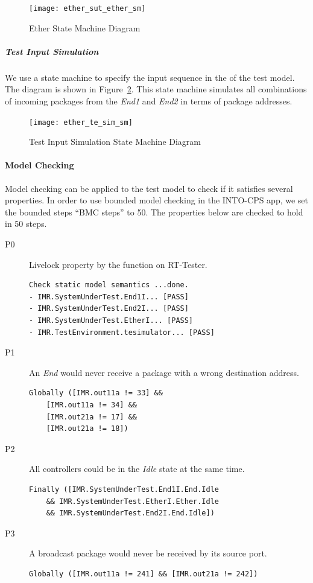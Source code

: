 \begin{figure}[htb!]
    \centering
	\texttt{[image: ether\_sut\_ether\_sm]}
    \caption{Ether State Machine Diagram}
    \label{fig:ether-sut-ether-sm}
\end{figure}

\subparagraph{Test Input Simulation} We use a state machine to specify the input sequence in the  of the test model. The diagram is shown in Figure~\ref{fig:ether-te-sim-sm}. This state machine simulates all combinations of incoming packages from the \emph{End1} and \emph{End2} in terms of package addresses. 

\begin{figure}[htb!]
    \centering
	\texttt{[image: ether\_te\_sim\_sm]}
    \caption{Test Input Simulation State Machine Diagram}
    \label{fig:ether-te-sim-sm}
\end{figure}

\paragraph{Model Checking}

Model checking can be applied to the test model to check if it satisfies several properties. In order to use bounded model checking in the INTO-CPS app, we set the bounded steps ``BMC steps'' to 50. The properties below are checked to hold in 50 steps.

\begin{description}
    \item[P0] Livelock property by the  function on RT-Tester.
\begin{verbatim}
Check static model semantics ...done.
- IMR.SystemUnderTest.End1I... [PASS]
- IMR.SystemUnderTest.End2I... [PASS]
- IMR.SystemUnderTest.EtherI... [PASS]
- IMR.TestEnvironment.tesimulator... [PASS]
\end{verbatim}

    \item[P1] An \emph{End} would never receive a package with a wrong destination address.
\begin{verbatim}
Globally ([IMR.out11a != 33] && 
    [IMR.out11a != 34] && 
    [IMR.out21a != 17] && 
    [IMR.out21a != 18])
\end{verbatim}

    \item[P2] All controllers could be in the \emph{Idle} state at the same time.
\begin{verbatim}
Finally ([IMR.SystemUnderTest.End1I.End.Idle
    && IMR.SystemUnderTest.EtherI.Ether.Idle
    && IMR.SystemUnderTest.End2I.End.Idle])
\end{verbatim}

    \item[P3] A broadcast package would never be received by its source port.
\begin{verbatim}
Globally ([IMR.out11a != 241] && [IMR.out21a != 242])
\end{verbatim}
\end{description}

